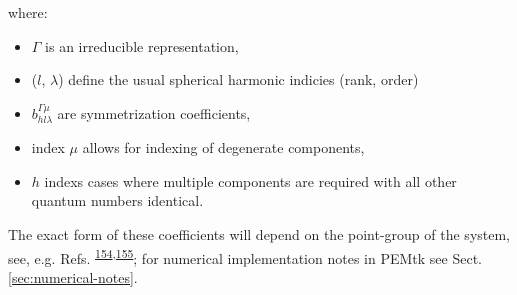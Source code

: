 \documentclass[10pt]{article}
\providecommand{\tightlist}{\setlength{\itemsep}{0pt}\setlength{\parskip}{0pt}}%
\begin{document}
where: 

\begin{itemize}
\item $\Gamma$ is an irreducible representation, 
\item ($l$, $\lambda$) define the usual spherical harmonic indicies (rank, order)
\item $b_{hl\lambda}^{\Gamma\mu}$ are symmetrization coefficients, 
\item index $\mu$ allows for indexing of degenerate components,
\item $h$ indexs cases where multiple components are required with all other quantum numbers identical. 
\end{itemize}
    
The exact form of these coefficients will depend on the point-group of the system, see, e.g. Refs. \textsuperscript{\hyperref[csl:154]{154},\hyperref[csl:155]{155}}; for numerical implementation notes in PEMtk see Sect. \ref{sec:numerical-notes}.


\end{document}

